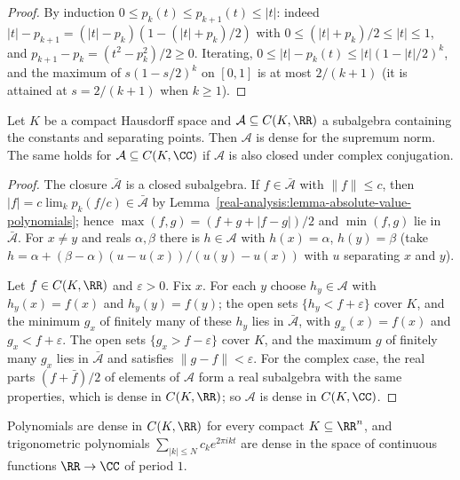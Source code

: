 \begin{proof}
By induction $0 \leq p_k(t) \leq p_{k+1}(t) \leq |t|$: indeed $|t| - p_{k+1} = (|t| - p_k)(1 - (|t| + p_k)/2)$ with $0 \leq (|t| + p_k)/2 \leq |t| \leq 1$, and $p_{k+1} - p_k = (t^2 - p_k^2)/2 \geq 0$. Iterating,
$0 \leq |t| - p_k(t) \leq |t|(1 - |t|/2)^k$, and the maximum of $s(1 - s/2)^k$ on $[0, 1]$ is at most $2/(k + 1)$ (it is attained at $s = 2/(k+1)$ when $k \geq 1$).
\end{proof}

\begin{theorem}\label{real-analysis:theorem-stone-weierstrass}
Let $K$ be a compact Hausdorff space and $\mathcal{A} \subseteq C(K, \RR)$ a subalgebra containing the constants and separating points. Then $\mathcal{A}$ is dense for the supremum norm. The same holds
for $\mathcal{A} \subseteq C(K, \CC)$ if $\mathcal{A}$ is also closed under complex conjugation.
\end{theorem}

\begin{proof}
The closure $\bar{\mathcal{A}}$ is a closed subalgebra. If $f \in \bar{\mathcal{A}}$ with $\|f\| \leq c$, then $|f| = c\lim_kp_k(f/c) \in \bar{\mathcal{A}}$ by Lemma~\ref{real-analysis:lemma-absolute-value-polynomials};
hence $\max(f, g) = (f + g + |f - g|)/2$ and $\min(f, g)$ lie in $\bar{\mathcal{A}}$. For $x \neq y$ and reals $\alpha, \beta$ there is $h \in \mathcal{A}$ with $h(x) = \alpha$, $h(y) = \beta$ (take
$h = \alpha + (\beta - \alpha)(u - u(x))/(u(y) - u(x))$ with $u$ separating $x$ and $y$).

Let $f \in C(K, \RR)$ and $\varepsilon > 0$. Fix $x$. For each $y$ choose $h_y \in \mathcal{A}$ with $h_y(x) = f(x)$ and $h_y(y) = f(y)$; the open sets $\{h_y < f + \varepsilon\}$ cover $K$, and the minimum $g_x$ of
finitely many of these $h_y$ lies in $\bar{\mathcal{A}}$, with $g_x(x) = f(x)$ and $g_x < f + \varepsilon$. The open sets $\{g_x > f - \varepsilon\}$ cover $K$, and the maximum $g$ of finitely many $g_x$ lies in
$\bar{\mathcal{A}}$ and satisfies $\|g - f\| < \varepsilon$. For the complex case, the real parts $(f + \bar f)/2$ of elements of $\mathcal{A}$ form a real subalgebra with the same properties, which is dense
in $C(K, \RR)$; so $\mathcal{A}$ is dense in $C(K, \CC)$.
\end{proof}

\begin{corollary}\label{real-analysis:corollary-weierstrass}
Polynomials are dense in $C(K, \RR)$ for every compact $K \subseteq \RR^n$, and trigonometric polynomials $\sum_{|k| \leq N}c_ke^{2\pi ikt}$ are dense in the space of continuous functions $\RR \to \CC$ of
period $1$.
\end{corollary}

